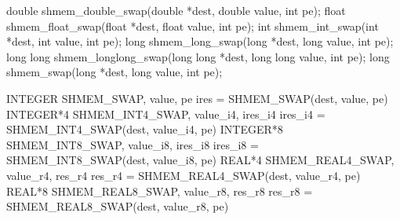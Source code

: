 
\begin{apidefinition}
 	  
\begin{Csynopsis}
double shmem_double_swap(double *dest, double value, int pe);
float shmem_float_swap(float *dest, float value, int pe);
int shmem_int_swap(int *dest, int value, int pe);
long shmem_long_swap(long *dest, long value, int pe);
long long shmem_longlong_swap(long long *dest, long long value, int pe);
long shmem_swap(long *dest, long value, int pe);
\end{Csynopsis}

\begin{Fsynopsis}
INTEGER SHMEM_SWAP, value, pe
ires = SHMEM_SWAP(dest, value, pe) 
INTEGER*4 SHMEM_INT4_SWAP, value_i4, ires_i4
ires_i4 = SHMEM_INT4_SWAP(dest, value_i4, pe) 
INTEGER*8 SHMEM_INT8_SWAP, value_i8, ires_i8
ires_i8 = SHMEM_INT8_SWAP(dest, value_i8, pe)
REAL*4 SHMEM_REAL4_SWAP, value_r4, res_r4
res_r4 = SHMEM_REAL4_SWAP(dest, value_r4, pe) 
REAL*8 SHMEM_REAL8_SWAP, value_r8, res_r8
res_r8 = SHMEM_REAL8_SWAP(dest, value_r8, pe)
\end{Fsynopsis}

\begin{apiarguments}
\end{apiarguments}





\end{apidefinition}
